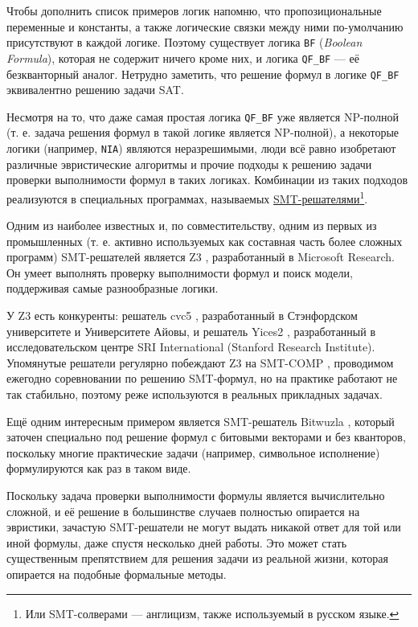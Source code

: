 Чтобы дополнить список примеров логик напомню, что пропозициональные переменные и константы, а также логические связки между ними по-умолчанию присутствуют в каждой логике. Поэтому существует логика \texttt{BF} (\textit{Boolean Formula}), которая не содержит ничего кроме них, и логика \texttt{QF\_BF} --- её безкванторный аналог. Нетрудно заметить, что решение формул в логике \texttt{QF\_BF} эквивалентно решению задачи SAT.


Несмотря на то, что даже самая простая логика \texttt{QF\_BF} уже является NP-полной (т. е. задача решения формул в такой логике является NP-полной), а некоторые логики (например, \texttt{NIA}) являются неразрешимыми, люди всё равно изобретают различные эвристические алгоритмы и прочие подходы к решению задачи проверки выполнимости формул в таких логиках. Комбинации из таких подходов реализуются в специальных программах, называемых \underline{SMT-решателями}\footnote{Или SMT-солверами --- англицизм, также используемый в русском языке.}.

Одним из наиболее известных и, по совместительству, одним из первых из промышленных (т. е. активно используемых как составная часть более сложных программ) SMT-решателей является Z3 \cite{z3-paper}, разработанный в Microsoft Research. Он умеет выполнять проверку выполнимости формул и поиск модели, поддерживая самые разнообразные логики.

У Z3 есть конкуренты: решатель cvc5 \cite{cvc5-paper}, разработанный в Стэнфордском университете и Университете Айовы, и решатель Yices2 \cite{yices2-paper}, разработанный в исследовательском центре SRI International (Stanford Research Institute). Упомянутые решатели регулярно побеждают Z3 на SMT-COMP \cite{smt-comp-paper} \cite{smt-comp-website}, проводимом ежегодно соревновании по решению SMT-формул, но на практике работают не так стабильно, поэтому реже используются в реальных прикладных задачах.

Ещё одним интересным примером является SMT-решатель Bitwuzla \cite{bitwuzla-paper}, который заточен специально под решение формул с битовыми векторами и без кванторов, поскольку многие практические задачи (например, символьное исполнение) формулируются как раз в таком виде.

Поскольку задача проверки выполнимости формулы является вычислительно сложной, и её решение в большинстве случаев полностью опирается на эвристики, зачастую SMT-решатели не могут выдать никакой ответ для той или иной формулы, даже спустя несколько дней работы. Это может стать существенным препятствием для решения задачи из реальной жизни, которая опирается на подобные формальные методы.

